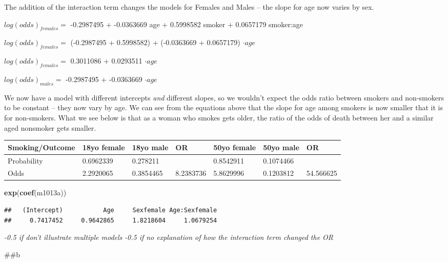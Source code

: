\documentclass[]{article}
\newenvironment{Shaded}{\begin{snugshade}}{\end{snugshade}}
\newcommand{\DataTypeTok}[1]{\textcolor[rgb]{0.13,0.29,0.53}{#1}}
\newcommand{\KeywordTok}[1]{\textcolor[rgb]{0.13,0.29,0.53}{\textbf{#1}}}
\newcommand{\NormalTok}[1]{#1}
\newcommand{\OperatorTok}[1]{\textcolor[rgb]{0.81,0.36,0.00}{\textbf{#1}}}
\newcommand{\StringTok}[1]{\textcolor[rgb]{0.31,0.60,0.02}{#1}}
\begin{document}
The addition of the interaction term changes the models for Females and
Males -- the slope for age now varies by sex.

\(log(odds)_{females} =\) -0.2987495 + -0.0363669 age + 0.5998582 smoker
+ 0.0657179 smoker:age

\(log(odds)_{females} =\) (-0.2987495 + 0.5998582) + (-0.0363669 +
0.0657179) \(\cdot age\)

\(log(odds)_{females} =\) 0.3011086 + 0.0293511 \(\cdot age\)

\(log(odds)_{males} =\) -0.2987495 + -0.0363669 \(\cdot age\)

We now have a model with different intercepts \emph{and} different
slopes, so we wouldn't expect the odds ratio between smokers and
non-smokers to be constant -- they now vary by age. We can see from the
equations above that the slope for age among smokers is now smaller that
it is for non-smokers. What we see below is that as a woman who smokes
gets older, the ratio of the odds of death between her and a similar
aged nonsmoker gets smaller.

\begin{longtable}[]{@{}lllllll@{}}
\toprule
Smoking/Outcome & 18yo female & 18yo male & OR & 50yo female & 50yo male
& OR\tabularnewline
\midrule
\endhead
Probability & 0.6962339 & 0.278211 & & 0.8542911 & 0.1074466
&\tabularnewline
Odds & 2.2920065 & 0.3854465 & 8.2383736 & 5.8629996 & 0.1203812 &
54.566625\tabularnewline
\bottomrule
\end{longtable}

\begin{Shaded}
\begin{Highlighting}[]
\KeywordTok{exp}\NormalTok{(}\KeywordTok{coef}\NormalTok{(m1013a))}
\end{Highlighting}
\end{Shaded}

\begin{verbatim}
##   (Intercept)           Age     Sexfemale Age:Sexfemale 
##     0.7417452     0.9642865     1.8218604     1.0679254
\end{verbatim}

\emph{-0.5 if don't illustrate multiple models } \emph{-0.5 if no
explanation of how the interaction term changed the OR}

\#\#b

\begin{Shaded}
\end{Shaded}
\end{document}
